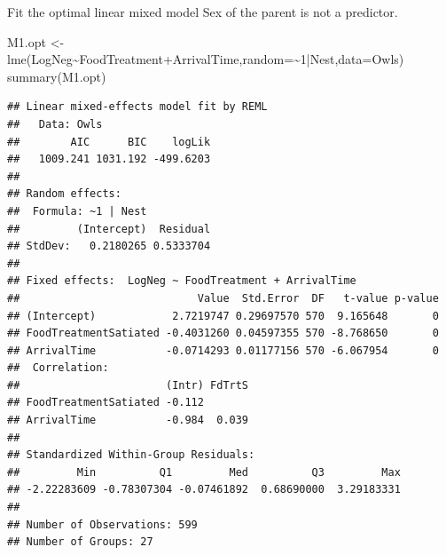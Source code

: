 \documentclass[
  ignorenonframetext,
]{beamer}
\newenvironment{Shaded}{\begin{snugshade}}{\end{snugshade}}
\newcommand{\AttributeTok}[1]{\textcolor[rgb]{0.77,0.63,0.00}{#1}}
\newcommand{\DecValTok}[1]{\textcolor[rgb]{0.00,0.00,0.81}{#1}}
\newcommand{\FunctionTok}[1]{\textcolor[rgb]{0.00,0.00,0.00}{#1}}
\newcommand{\NormalTok}[1]{#1}
\newcommand{\OtherTok}[1]{\textcolor[rgb]{0.56,0.35,0.01}{#1}}
\newcommand{\SpecialCharTok}[1]{\textcolor[rgb]{0.00,0.00,0.00}{#1}}
\begin{document}
\begin{frame}[fragile]{Fit the optimal linear mixed model}
\protect\hypertarget{fit-the-optimal-linear-mixed-model}{}
Sex of the parent is not a predictor. \tiny

\begin{Shaded}
\begin{Highlighting}[]
\NormalTok{M1.opt }\OtherTok{\textless{}{-}} \FunctionTok{lme}\NormalTok{(LogNeg}\SpecialCharTok{\textasciitilde{}}\NormalTok{FoodTreatment}\SpecialCharTok{+}\NormalTok{ArrivalTime,}\AttributeTok{random=}\SpecialCharTok{\textasciitilde{}}\DecValTok{1}\SpecialCharTok{|}\NormalTok{Nest,}\AttributeTok{data=}\NormalTok{Owls)}
\FunctionTok{summary}\NormalTok{(M1.opt)}
\end{Highlighting}
\end{Shaded}

\begin{verbatim}
## Linear mixed-effects model fit by REML
##   Data: Owls 
##        AIC      BIC    logLik
##   1009.241 1031.192 -499.6203
## 
## Random effects:
##  Formula: ~1 | Nest
##         (Intercept)  Residual
## StdDev:   0.2180265 0.5333704
## 
## Fixed effects:  LogNeg ~ FoodTreatment + ArrivalTime 
##                            Value  Std.Error  DF   t-value p-value
## (Intercept)            2.7219747 0.29697570 570  9.165648       0
## FoodTreatmentSatiated -0.4031260 0.04597355 570 -8.768650       0
## ArrivalTime           -0.0714293 0.01177156 570 -6.067954       0
##  Correlation: 
##                       (Intr) FdTrtS
## FoodTreatmentSatiated -0.112       
## ArrivalTime           -0.984  0.039
## 
## Standardized Within-Group Residuals:
##         Min          Q1         Med          Q3         Max 
## -2.22283609 -0.78307304 -0.07461892  0.68690000  3.29183331 
## 
## Number of Observations: 599
## Number of Groups: 27
\end{verbatim}
\end{frame}
\end{document}
